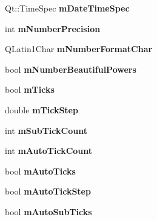 \begin{DoxyCompactItemize}
\item 
\hypertarget{classQCPAxis_af73bec228c1a3203dc8aef1e84a46759}{}Qt\+::\+Time\+Spec {\bfseries m\+Date\+Time\+Spec}\label{classQCPAxis_af73bec228c1a3203dc8aef1e84a46759}

\item 
\hypertarget{classQCPAxis_acd76e8c783384d99ccc4a13797eec188}{}int {\bfseries m\+Number\+Precision}\label{classQCPAxis_acd76e8c783384d99ccc4a13797eec188}

\item 
\hypertarget{classQCPAxis_a39594313deef458f425bba25cd337a8a}{}Q\+Latin1\+Char {\bfseries m\+Number\+Format\+Char}\label{classQCPAxis_a39594313deef458f425bba25cd337a8a}

\item 
\hypertarget{classQCPAxis_af03809bee3f3e35fcc38d25b6dd5003b}{}bool {\bfseries m\+Number\+Beautiful\+Powers}\label{classQCPAxis_af03809bee3f3e35fcc38d25b6dd5003b}

\item 
\hypertarget{classQCPAxis_ab111e74bba22e06848897c932fc549fe}{}bool {\bfseries m\+Ticks}\label{classQCPAxis_ab111e74bba22e06848897c932fc549fe}

\item 
\hypertarget{classQCPAxis_a4fe96830fc5a2711e20fe5edccfe2ed3}{}double {\bfseries m\+Tick\+Step}\label{classQCPAxis_a4fe96830fc5a2711e20fe5edccfe2ed3}

\item 
\hypertarget{classQCPAxis_ad70198e6ae2801fc409bc3caec707da9}{}int {\bfseries m\+Sub\+Tick\+Count}\label{classQCPAxis_ad70198e6ae2801fc409bc3caec707da9}

\item 
\hypertarget{classQCPAxis_a499fbb67111e4b204738f6c1aa28d842}{}int {\bfseries m\+Auto\+Tick\+Count}\label{classQCPAxis_a499fbb67111e4b204738f6c1aa28d842}

\item 
\hypertarget{classQCPAxis_aac23adcbae246bf165d4539ad65ac9f9}{}bool {\bfseries m\+Auto\+Ticks}\label{classQCPAxis_aac23adcbae246bf165d4539ad65ac9f9}

\item 
\hypertarget{classQCPAxis_aada8934a5c44978653031782aa37d101}{}bool {\bfseries m\+Auto\+Tick\+Step}\label{classQCPAxis_aada8934a5c44978653031782aa37d101}

\item 
\hypertarget{classQCPAxis_aaae980b0d193d959674e314dbb6c2c3b}{}bool {\bfseries m\+Auto\+Sub\+Ticks}\label{classQCPAxis_aaae980b0d193d959674e314dbb6c2c3b}


\end{DoxyCompactItemize}
